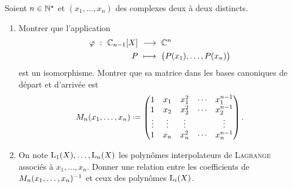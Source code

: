 \begin{exercice}
    Soient $n \in \mathbb{N}^\star$ et $(x_1, \dots, x_n)$ des complexes deux à deux distincts.
    \begin{enumerate}
        \item Montrer que l'application
        \begin{alignat*}{2}
            \varphi\ :\ \mathbb{C}_{n-1}[X]\ &\longrightarrow\ \mathbb{C}^n\\
            P\ &\longmapsto\ \big( P(x_1), \dots, P(x_n) \big)
        \end{alignat*}
        est un isomorphisme. Montrer que sa matrice dans les bases canoniques de départ et d'arrivée est 
        $$
        M_n(x_1, \dots, x_n) \defeq
        \begin{pmatrix}
            1 & x_1 & x_1^2 & \cdots & x_1^{n-1} \\
            1 & x_2 & x_2^2 & \cdots & x_2^{n-1} \\
            \vdots & \vdots & \vdots & & \vdots \\
            1 & x_n & x_n^2 & \cdots & x_n^{n-1}
        \end{pmatrix}.
        $$
        \item On note $\mathrm{L}_1(X), \dots, \mathrm{L}_n(X)$ les polynômes interpolateurs de \textsc{Lagrange} associés à $x_1, \dots, x_n$. Donner une relation entre les coefficients de $M_n(x_1, \dots, x_n)^{-1}$ et ceux des polynômes $\mathrm{L}_i(X)$.
    \end{enumerate}
\end{exercice}
